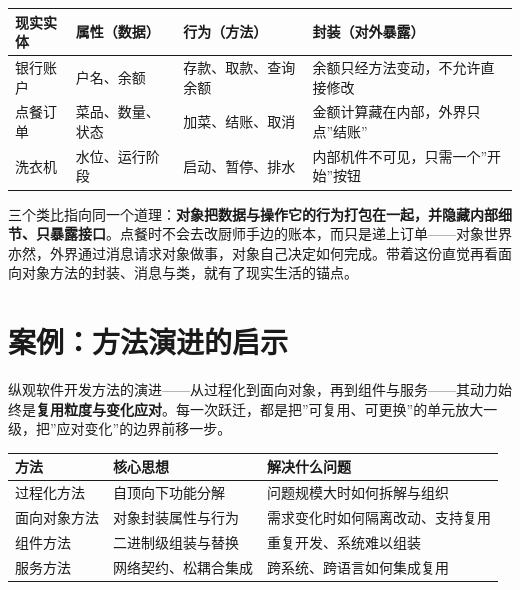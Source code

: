 \documentclass[12pt,a4paper,twoside,openany]{ctexbook}
\numberwithin{figure}{chapter}
\numberwithin{table}{chapter}
\newcounter{none}
\begin{document}
{\def\LTcaptype{none} %
\begin{longtable}[]{@{}
  >{\raggedright\arraybackslash}p{}
  >{\raggedright\arraybackslash}p{}
  >{\raggedright\arraybackslash}p{}
  >{\raggedright\arraybackslash}p{}@{}}
\toprule\noalign{}
\begin{minipage}[b]{\linewidth}\raggedright
现实实体
\end{minipage} & \begin{minipage}[b]{\linewidth}\raggedright
属性（数据）
\end{minipage} & \begin{minipage}[b]{\linewidth}\raggedright
行为（方法）
\end{minipage} & \begin{minipage}[b]{\linewidth}\raggedright
封装（对外暴露）
\end{minipage} \\
\midrule\noalign{}
\endhead
\bottomrule\noalign{}
\endlastfoot
银行账户 & 户名、余额 & 存款、取款、查询余额 &
余额只经方法变动，不允许直接修改 \\
点餐订单 & 菜品、数量、状态 & 加菜、结账、取消 &
金额计算藏在内部，外界只点''结账'' \\
洗衣机 & 水位、运行阶段 & 启动、暂停、排水 &
内部机件不可见，只需一个''开始''按钮 \\
\end{longtable}
}

三个类比指向同一个道理：\textbf{对象把数据与操作它的行为打包在一起，并隐藏内部细节、只暴露接口}。点餐时不会去改厨师手边的账本，而只是递上订单------对象世界亦然，外界通过消息请求对象做事，对象自己决定如何完成。带着这份直觉再看面向对象方法的封装、消息与类，就有了现实生活的锚点。

\section{案例：方法演进的启示}\label{ux6848ux4f8bux65b9ux6cd5ux6f14ux8fdbux7684ux542fux793a}

纵观软件开发方法的演进------从过程化到面向对象，再到组件与服务------其动力始终是\textbf{复用粒度与变化应对}。每一次跃迁，都是把''可复用、可更换''的单元放大一级，把''应对变化''的边界前移一步。

{\def\LTcaptype{none} %
\begin{longtable}[]{@{}lll@{}}
\toprule\noalign{}
方法 & 核心思想 & 解决什么问题 \\
\midrule\noalign{}
\endhead
\bottomrule\noalign{}
\endlastfoot
过程化方法 & 自顶向下功能分解 & 问题规模大时如何拆解与组织 \\
面向对象方法 & 对象封装属性与行为 & 需求变化时如何隔离改动、支持复用 \\
组件方法 & 二进制级组装与替换 & 重复开发、系统难以组装 \\
服务方法 & 网络契约、松耦合集成 & 跨系统、跨语言如何集成复用 \\
\end{longtable}
}
\end{document}
